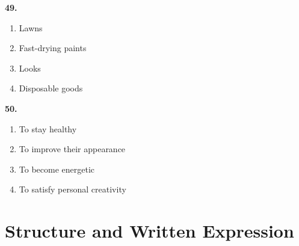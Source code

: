 \documentclass[12pt]{article}
\begin{document}
\par
\vspace{0.25\baselineskip}
\noindent\textbf{49.}
\begin{enumerate}[label=(\Alph*),leftmargin=*,itemsep=0.2em]
\item Lawns
\item Fast-drying paints
\item Looks
\item Disposable goods
\end{enumerate}
\par
\vspace{0.25\baselineskip}
\noindent\textbf{50.}
\begin{enumerate}[label=(\Alph*),leftmargin=*,itemsep=0.2em]
\item To stay healthy
\item To improve their appearance
\item To become energetic
\item To satisfy personal creativity
\end{enumerate}
\par
\vspace{0.25\baselineskip}
\section*{Structure and Written Expression}
\end{document}
